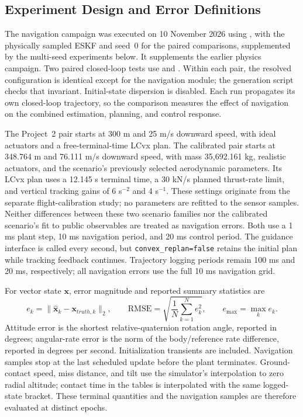 \subsection{Experiment Design and Error Definitions}\label{sec:nav-experiments}

The navigation campaign was executed on 10 November 2026 using
, with the physically sampled ESKF and
seed~0 for the paired comparisons, supplemented by the multi-seed experiments below. It supplements the earlier physics campaign. Two paired closed-loop tests use
 and . Within each pair,
the resolved configuration is identical except for the navigation module; the generation
script checks that invariant. Initial-state dispersion is disabled. Each run propagates
its own closed-loop trajectory, so the comparison measures the effect of navigation on
the combined estimation, planning, and control response.

The Project~2 pair starts at 300 m and 25 m/s downward speed, with ideal actuators and a
free-terminal-time LCvx plan. The calibrated pair starts at 348.764 m and 76.111 m/s
downward speed, with mass 35,692.161 kg, realistic actuators, and the scenario's previously
selected aerodynamic parameters. Its LCvx plan uses a 12.145 s terminal time, a 30 kN/s
planned thrust-rate limit, and vertical tracking gains of 6 s$^{-2}$ and 4 s$^{-1}$.
These settings originate from the separate flight-calibration study; no parameters are
refitted to the sensor samples. Neither differences between these two scenario families
nor the calibrated scenario's fit to public observables are treated as navigation errors.
Both use a 1 ms plant step, 10 ms navigation period, and 20 ms control period. The guidance
interface is called every second, but \texttt{convex\_replan=false} retains the initial plan
while tracking feedback continues. Trajectory logging periods remain 100 ms and 20 ms,
respectively; all navigation errors use the full 10 ms navigation grid.

For vector state $\bm x$, error magnitude and reported summary statistics are
\begin{equation}
 e_k=\|\widehat{\bm x}_k-\bm x_{truth,k}\|_2,\qquad
 \mathrm{RMSE}=\sqrt{\frac1N\sum_{k=1}^{N}e_k^2},\qquad e_{\max}=\max_k e_k.
\end{equation}
Attitude error is the shortest relative-quaternion rotation angle, reported in degrees;
angular-rate error is the norm of the body/reference rate difference, reported in degrees
per second. Initialization transients are included. Navigation samples stop at the last
scheduled update before the plant terminates. Ground-contact speed, miss distance, and
tilt use the simulator's interpolation to zero radial altitude; contact time in the tables
is interpolated with the same logged-state bracket. These terminal quantities and the
navigation samples are therefore evaluated at distinct epochs.

